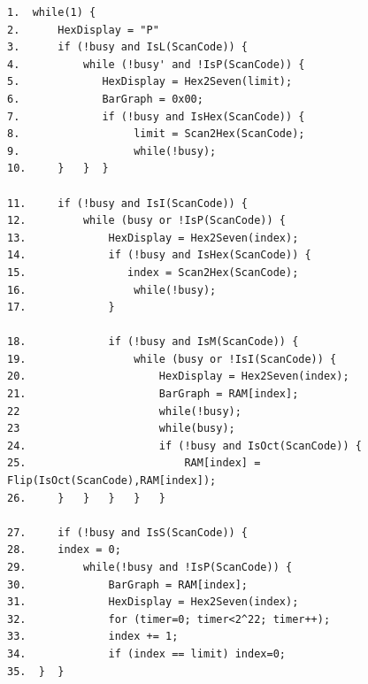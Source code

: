 \documentclass{article}[10 pt,landscape]
\begin{document}
\pagebreak
\begin{verbatim}
1.  while(1) {
2.      HexDisplay = "P"
3.      if (!busy and IsL(ScanCode)) {
4.          while (!busy' and !IsP(ScanCode)) {
5.             HexDisplay = Hex2Seven(limit);
6.             BarGraph = 0x00;
7.             if (!busy and IsHex(ScanCode)) {
8.                  limit = Scan2Hex(ScanCode);
9.                  while(!busy);
10.     }   }  }

11.     if (!busy and IsI(ScanCode)) {
12.         while (busy or !IsP(ScanCode)) {
13.             HexDisplay = Hex2Seven(index);
14.             if (!busy and IsHex(ScanCode)) {
15.                index = Scan2Hex(ScanCode);
16.                 while(!busy);
17.             }

18.             if (!busy and IsM(ScanCode)) {
19.                 while (busy or !IsI(ScanCode)) {
20.                     HexDisplay = Hex2Seven(index);
21.                     BarGraph = RAM[index];
22             	        while(!busy);
23             	        while(busy);
24.                     if (!busy and IsOct(ScanCode)) {
25.                         RAM[index] = Flip(IsOct(ScanCode),RAM[index]);
26.     }   }   }   }   }

27.     if (!busy and IsS(ScanCode)) {
28.	    index = 0;
29.         while(!busy and !IsP(ScanCode)) {
30.             BarGraph = RAM[index];
31.             HexDisplay = Hex2Seven(index);
32.             for (timer=0; timer<2^22; timer++);
33.             index += 1;
34.             if (index == limit) index=0;
35.  }  }   
\end{verbatim}
\end{document}
